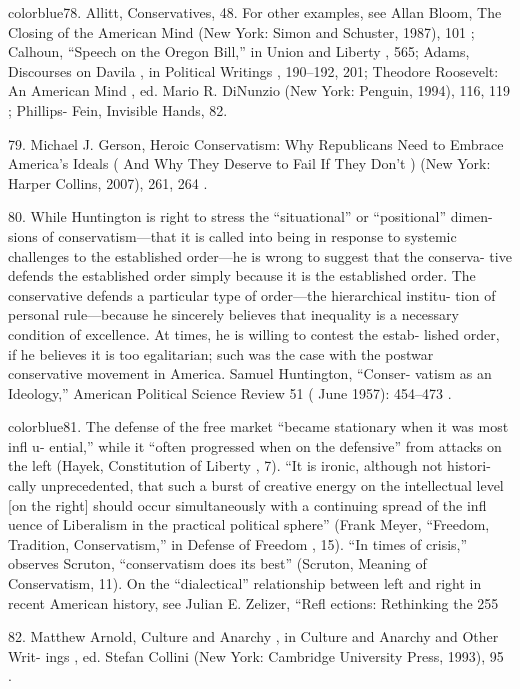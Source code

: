 	{color{blue}78}. Allitt, Conservatives, 48. For other examples, see Allan Bloom, The Closing of the American Mind (New York: Simon and Schuster, 1987), 101 ; Calhoun, “Speech on the Oregon Bill,” in Union and Liberty , 565; Adams, Discourses on Davila , in Political Writings , 190–192, 201; Theodore Roosevelt: An American Mind , ed. Mario R. DiNunzio (New York: Penguin, 1994), 116, 119 ; Phillips- Fein, Invisible Hands, 82.


	{\color{blue}79}. Michael J. Gerson, Heroic Conservatism: Why Republicans Need to Embrace America’s Ideals ( And Why They Deserve to Fail If They Don’t ) (New York: Harper Collins, 2007), 261, 264 .


	{\color{blue}80}. While Huntington is right to stress the “situational” or “positional” dimen- sions of conservatism—that it is called into being in response to systemic challenges to the established order—he is wrong to suggest that the conserva- tive defends the established order simply because it is the established order. The conservative defends a particular type of order—the hierarchical institu- tion of personal rule—because he sincerely believes that inequality is a necessary condition of excellence. At times, he is willing to contest the estab- lished order, if he believes it is too egalitarian; such was the case with the postwar conservative movement in America. Samuel Huntington, “Conser- vatism as an Ideology,” American Political Science Review 51 ( June 1957): 454–473 .


	{color{blue}81}. The defense of the free market “became stationary when it was most infl u- ential,” while it “often progressed when on the defensive” from attacks on the left (Hayek, Constitution of Liberty , 7). “It is ironic, although not histori- cally unprecedented, that such a burst of creative energy on the intellectual level [on the right] should occur simultaneously with a continuing spread of the infl uence of Liberalism in the practical political sphere” (Frank Meyer, “Freedom, Tradition, Conservatism,” in Defense of Freedom , 15). “In times of crisis,” observes Scruton, “conservatism does its best” (Scruton, Meaning of Conservatism, 11). On the “dialectical” relationship between left and right in recent American history, see Julian E. Zelizer, “Refl ections: Rethinking the 255


	{\color{blue}82}. Matthew Arnold, Culture and Anarchy , in Culture and Anarchy and Other Writ- ings , ed. Stefan Collini (New York: Cambridge University Press, 1993), 95 .


